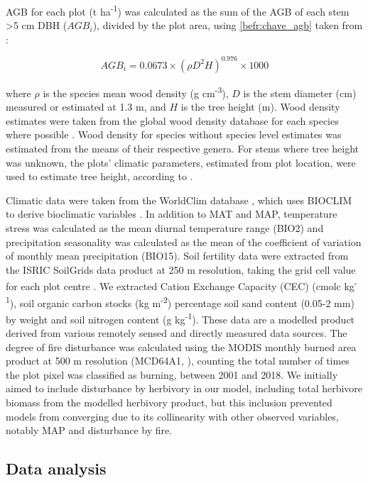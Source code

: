 \begin{refsection}
AGB for each plot (t ha\textsuperscript{-1}) was calculated as the sum of the AGB of each stem >5 cm DBH ($AGB_{i}$), divided by the plot area, using \autoref{befr:chave_agb} taken from \citet{Chave2014}:

\begin{equation}
	AGB_{i} = 0.0673 \times (\rho D^{2} H)^{0.976} \times 1000
	\label{befr:chave_agb}
\end{equation}

where $\rho$ is the species mean wood density (g cm\textsuperscript{-3}), $D$ is the stem diameter (cm) measured or estimated at 1.3 m, and $H$ is the tree height (m). Wood density estimates were taken from the global wood density database for each species where possible \citep{Chave2009, Zanne2009}. Wood density for species without species level estimates was estimated from the means of their respective genera. For stems where tree height was unknown, the plots' climatic parameters, estimated from plot location, were used to estimate tree height, according to \citet{Chave2014}.

Climatic data were taken from the WorldClim database \citep{Fick2017}, which uses BIOCLIM to derive bioclimatic variables \citep{Booth2014}. In addition to MAT and MAP, temperature stress was calculated as the mean diurnal temperature range (BIO2) and precipitation seasonality was calculated as the mean of the coefficient of variation of monthly mean precipitation (BIO15). Soil fertility data were extracted from the ISRIC SoilGrids data product at 250 m resolution, taking the grid cell value for each plot centre \citep{Hengl2017}. We extracted Cation Exchange Capacity (CEC) (cmolc kg\textsuperscript{-1}), soil organic carbon stocks (kg m\textsuperscript{-2}) percentage soil sand content (0.05-2 mm) by weight and soil nitrogen content (g kg\textsuperscript{-1}). These data are a modelled product derived from various remotely sensed and directly measured data sources. The degree of fire disturbance was calculated using the MODIS monthly burned area product at 500 m resolution (MCD64A1, \citealt{MCD64A1}), counting the total number of times the plot pixel was classified as burning, between 2001 and 2018. We initially aimed to include disturbance by herbivory in our model, including total herbivore biomass from the \citet{Hempson2017} modelled herbivory product, but this inclusion prevented models from converging due to its collinearity with other observed variables, notably MAP and disturbance by fire. 

\subsection{Data analysis}
\label{befr:ssec:analysis}


\end{refsection}
